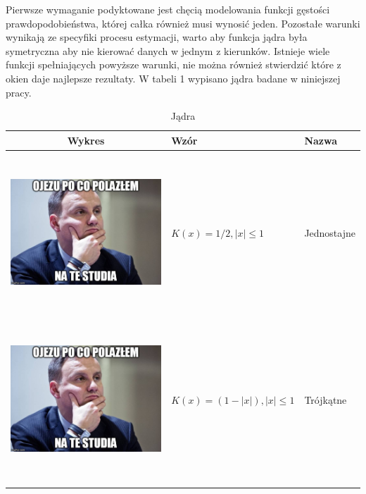 \documentclass[a4paper,12pt,twoside]{article}
\begin{document}
Pierwsze wymaganie podyktowane jest chęcią modelowania funkcji gęstości prawdopodobieństwa, której całka również musi wynosić jeden. Pozostałe warunki wynikają ze specyfiki procesu estymacji, warto aby funkcja jądra była symetryczna aby nie kierować danych w jednym z kierunków.  Istnieje wiele funkcji spełniających powyższe warunki, nie można również stwierdzić które z okien daje najlepsze rezultaty. W tabeli 1 wypisano jądra badane w niniejszej pracy. 
\newpage
\begin{table}[h!]
  \centering
  \caption{Jądra}
  \begin{tabular}{ | c | m{6cm} | m{3cm} | }
    \hline
    Wykres & Wzór & Nazwa \\ \hline
    \begin{minipage}[c][7cm]{.4\textwidth}
      \includegraphics[width=\linewidth, height=60mm]{dudel.jpg}
    \end{minipage}
    &
     $ K(x)=1/2, |x|\leq1$
    & 
    Jednostajne
    \\ \hline
    \begin{minipage}[c][7cm]{.4\textwidth}
      \includegraphics[width=\linewidth, height=60mm]{dudel.jpg}
    \end{minipage}
    &
     $ K(x)=(1-|x|), |x|\leq1$
    & 
    Trójkątne
    \\ \hline
    \begin{minipage}[c][7cm]{.4\textwidth}

\end{minipage}
\end{tabular}
\end{table}
\end{document}
